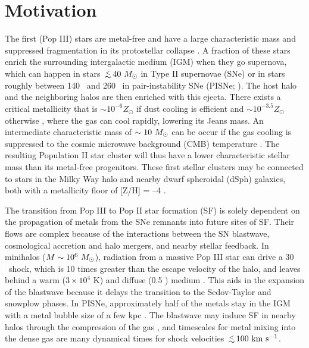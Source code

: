 \documentclass[12pt]{article}
\newcommand{\cubecm}{\ifmmode{{\rm cm^{-3}}}\else{cm$^{-3}$}\fi}
\newcommand{\lsim}{\lower0.3em\hbox{$\,\buildrel <\over\sim\,$}}
\newcommand{\kms}{\ifmmode{{\rm km~s^{-1}}}\else{km s$^{-1}$}\fi}
\newcommand{\Ms}{\ifmmode{M_\odot}\else{$M_\odot$}\fi}
\begin{document}
\section*{Motivation}

The first (Pop III) stars are metal-free and have a large
characteristic mass and suppressed fragmentation in its protostellar
collapse \cite{ABN02, Bromm02_P3, Yoshida03, OShea07a}.  A fraction of
these stars enrich the surrounding intergalactic medium (IGM) when
they go supernova, which can happen in stars $\lsim 40~\Ms$ in Type II
supernovae (SNe) or in stars roughly between 140 \Ms~and 260 \Ms~in
pair-instability SNe (PISNe; \cite{2002ApJ...567..532H}).  The host
halo and the neighboring halos are then enriched with this ejecta.
There exists a critical metallicity that is $\sim 10^{-6} Z_\odot$ if
dust cooling is efficient \cite{Omukai05, Schneider06_Frag, clark08}
and $\sim 10^{-3.5} Z_\odot$ otherwise \cite{Bromm01,
  2009ApJ...691..441S}, where the gas can cool rapidly, lowering its
Jeans mass.  An intermediate characteristic mass of $\sim10~\Ms$ can
be occur if the gas cooling is suppressed to the cosmic microwave
background (CMB) temperature \cite{Larson98, Tumlinson07_IMF,
  2009ApJ...691..441S}.  The resulting Population II star cluster will
thus have a lower characteristic stellar mass than its metal-free
progenitors.  These first stellar clusters may be connected to stars
in the Milky Way halo and nearby dwarf spheroidal (dSph) galaxies,
both with a metallicity floor of [Z/H] = --4 \cite{Beers05,
  Tafelmeyer10, Frebel10_Obs}.

The transition from Pop III to Pop II star formation (SF) is solely
dependent on the propagation of metals from the SNe remnants into
future sites of SF.  Their flows are complex because of the
interactions between the SN blastwave, cosmological accretion and halo
mergers, and nearby stellar feedback.  In minihalos ($M \sim
10^6~\Ms$), radiation from a massive Pop III star can drive a 30
\kms~shock, which is 10 times greater than the escape velocity of the
halo, and leaves behind a warm ($3 \times 10^4$ K) and diffuse (0.5
\cubecm) medium \cite{Kitayama04, Whalen04, Abel07}.  This aids in the
expansion of the blastwave because it delays the transition to the
Sedov-Taylor and snowplow phases.  In PISNe, approximately half of the
metals stay in the IGM with a metal bubble size of a few kpc
\cite{Wise08_Gal, Greif10}.  The blastwave may induce SF in nearby
halos through the compression of the gas \cite{Ferrara98}, and
timescales for metal mixing into the dense gas are many dynamical
times \cite{Cen08} for shock velocities $\lsim100~\kms$.
\end{document}
